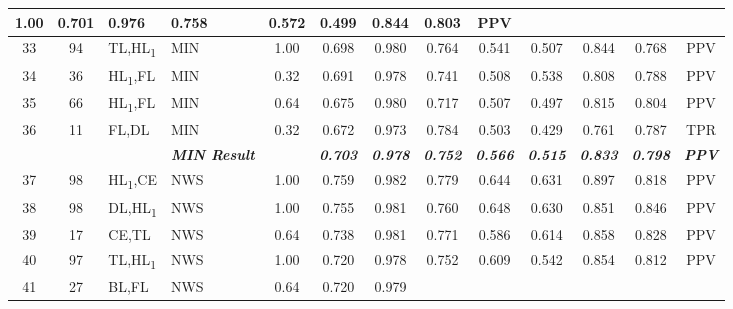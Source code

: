 \begin{table}[H]
{\begin{tabular}{ccl|l|c|c|c|c|c|c|c|c|c|}
    1.00 &
    0.701 &
    0.976 &
    0.758 &
    0.572 &
    0.499 &
    0.844 &
    0.803 &
    PPV \\ \hline
  \multicolumn{1}{|c|}{33} &
    \multicolumn{1}{c|}{94} &
    TL,HL\textsubscript{1} &
    MIN &
    1.00 &
    0.698 &
    0.980 &
    0.764 &
    0.541 &
    0.507 &
    0.844 &
    0.768 &
    PPV \\ \hline
  \multicolumn{1}{|c|}{34} &
    \multicolumn{1}{c|}{36} &
    HL\textsubscript{1},FL &
    MIN &
    0.32 &
    0.691 &
    0.978 &
    0.741 &
    0.508 &
    0.538 &
    0.808 &
    0.788 &
    PPV \\ \hline
  \multicolumn{1}{|c|}{35} &
    \multicolumn{1}{c|}{66} &
    HL\textsubscript{1},FL &
    MIN &
    0.64 &
    0.675 &
    0.980 &
    0.717 &
    0.507 &
    0.497 &
    0.815 &
    0.804 &
    PPV \\ \hline
  \multicolumn{1}{|c|}{36} &
    \multicolumn{1}{c|}{11} &
    FL,DL &
    MIN &
    0.32 &
    0.672 &
    0.973 &
    0.784 &
    0.503 &
    0.429 &
    0.761 &
    0.787 &
    TPR \\ \hline
   &
    \textit{\textbf{}} &
     &
    \textit{\textbf{MIN Result}} &
     &
    \textit{\textbf{0.703}} &
    \textit{\textbf{0.978}} &
    \textit{\textbf{0.752}} &
    \textit{\textbf{0.566}} &
    \textit{\textbf{0.515}} &
    \textit{\textbf{0.833}} &
    \textit{\textbf{0.798}} &
    \textit{\textbf{PPV}} \\ \hline
  \multicolumn{1}{|c|}{37} &
    \multicolumn{1}{c|}{98} &
    HL\textsubscript{1},CE &
    NWS &
    1.00 &
    0.759 &
    0.982 &
    0.779 &
    0.644 &
    0.631 &
    0.897 &
    0.818 &
    PPV \\ \hline
  \multicolumn{1}{|c|}{38} &
    \multicolumn{1}{c|}{98} &
    DL,HL\textsubscript{1} &
    NWS &
    1.00 &
    0.755 &
    0.981 &
    0.760 &
    0.648 &
    0.630 &
    0.851 &
    0.846 &
    PPV \\ \hline
  \multicolumn{1}{|c|}{39} &
    \multicolumn{1}{c|}{17} &
    CE,TL &
    NWS &
    0.64 &
    0.738 &
    0.981 &
    0.771 &
    0.586 &
    0.614 &
    0.858 &
    0.828 &
    PPV \\ \hline
  \multicolumn{1}{|c|}{40} &
    \multicolumn{1}{c|}{97} &
    TL,HL\textsubscript{1} &
    NWS &
    1.00 &
    0.720 &
    0.978 &
    0.752 &
    0.609 &
    0.542 &
    0.854 &
    0.812 &
    PPV \\ \hline
  \multicolumn{1}{|c|}{41} &
    \multicolumn{1}{c|}{27} &
    BL,FL &
    NWS &
    0.64 &
    0.720 &
    0.979 &

\end{tabular}}
\end{table}
